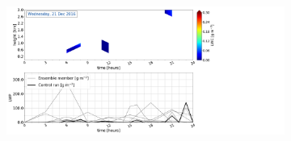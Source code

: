 \begin{figure}[h]%
		\centering
		\begin{subfigure}[b]{0.8\textwidth}
			\includegraphics[trim={0.5cm 0.5cm 17.5cm .5cm},clip,width=\textwidth]{./fig_LWC/20161221}
			\caption{}\label{fig:LWC21}
		\end{subfigure}
\end{figure}
